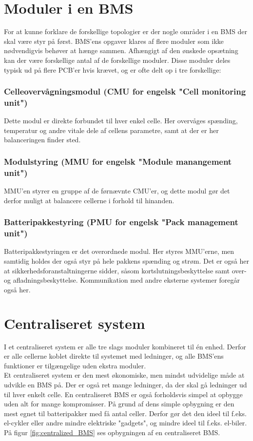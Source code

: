 \section{Moduler i en BMS}
For at kunne forklare de forskellige topologier er der nogle områder i en BMS der skal være styr på først. BMS'ens opgaver klares af flere moduler som ikke nødvendigvis behøver at hænge sammen. Afhængigt af den ønskede opsætning kan der være forskellige antal af de forskellige moduler. Disse moduler deles typisk ud på flere PCB'er hvis krævet, og er ofte delt op i tre forskellige: 

\subsubsection{Celleovervågningsmodul (CMU for engelsk "Cell monitoring unit")}
Dette modul er direkte forbundet til hver enkel celle. Her overvåges spænding, temperatur og andre vitale dele af cellens parametre, samt at der er her balanceringen finder sted. 

\subsubsection{Modulstyring (MMU for engelsk "Module manangement unit")}
MMU'en styrer en gruppe af de førnævnte CMU'er, og dette modul gør det derfor muligt at balancere cellerne i forhold til hinanden. 

\subsubsection{Batteripakkestyring (PMU for engelsk "Pack management unit")}
Batteripakkestyringen er det overordnede modul. Her styres MMU'erne, men samtidig holdes der også styr på hele pakkens spænding og strøm. Det er også her at sikkerhedsforanstaltningerne sidder, såsom kortslutningsbeskyttelse samt over- og afladningsbeskyttelse. Kommunikation med andre eksterne systemer foregår også her. 

\section{Centraliseret system}
I et centraliseret system er alle tre slags moduler kombineret til én enhed. Derfor er alle cellerne koblet direkte til systemet med ledninger, og alle BMS'ens funktioner er tilgængelige uden ekstra moduler. \\

Et centraliseret system er den mest økonomiske, men mindst udvidelige måde at udvikle en BMS på. Der er også ret mange ledninger, da der skal gå ledninger ud til hver enkelt celle. En centraliseret BMS er også forholdsvis simpel at opbygge uden alt for mange kompromisser. På grund af dens simple opbygning er den mest egnet til batteripakker med få antal celler. Derfor gør det den ideel til f.eks. el-cykler eller andre mindre elektriske "gadgets", og mindre ideel til f.eks. el-biler. På figur \ref{fig:centralized_BMS} ses opbygningen af en centraliseret BMS.

